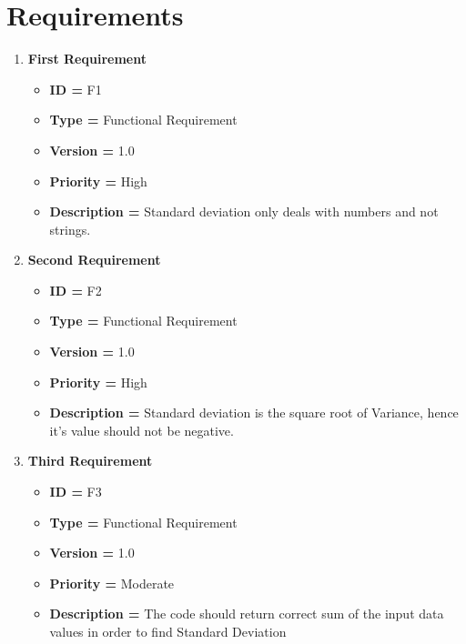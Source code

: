 \documentclass[a4paper, 12pt]{article}
\begin{document}
\section*{Requirements}
\begin{enumerate}[noitemsep]
        \item \textbf{First Requirement}
        \begin{itemize}[noitemsep]
            \item \textbf{ID = } F1
            \item\textbf{Type = } Functional Requirement
            \item\textbf{Version = } 1.0
            \item\textbf{Priority = } High
            \item\textbf{Description = } Standard deviation only deals with numbers and not strings.
        \end{itemize}
        \item \textbf{Second Requirement}
        \begin{itemize}[noitemsep]
            \item \textbf{ID = } F2
            \item\textbf{Type = } Functional Requirement
            \item\textbf{Version = } 1.0
            \item\textbf{Priority = } High
            \item\textbf{Description = } Standard deviation is the square root of Variance, hence it's value should not be negative.
        \end{itemize}
        \item \textbf{Third Requirement}
        \begin{itemize}[noitemsep]
            \item \textbf{ID = } F3
            \item\textbf{Type = } Functional Requirement
            \item\textbf{Version = } 1.0
            \item\textbf{Priority = } Moderate
            \item\textbf{Description = }  The code should return correct sum of the input data values in order to find Standard Deviation
        \end{itemize}
        

\end{enumerate}
\end{document}
